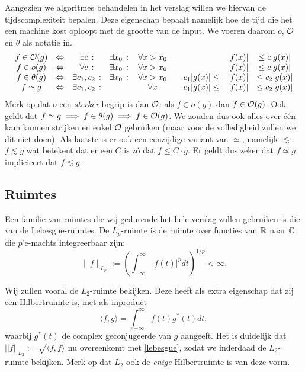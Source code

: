 Aangezien we algoritmes behandelen in het verslag willen we hiervan de tijdscomplexiteit bepalen.
Deze eigenschap bepaalt namelijk hoe de tijd die het een machine kost oploopt met de grootte van de input.
We voeren daarom $o$, $\mathcal{O}$ en $\theta$ als notatie in.
\begin{equation*}
\begin{array}{cccccccc}
  f \in \mathcal{O}(g)     &\Leftrightarrow& \exists c     \,:&\exists x_0  \,:&\, 
  \forall x>x_0 \quad&& |f(x)| &\leq c|g(x)|  \\
  f \in o(g)      &\Leftrightarrow& \forall c     \,:&\exists x_0  \,:&\, 
  \forall x>x_0 \quad&& |f(x)| &\leq c |g(x)| \\ 
  f \in \theta(g) &\Leftrightarrow& \exists c_1,c_2\,:&\exists x_0  \,:&\, 
  \forall x>x_0 \quad& c_1|g(x)| \leq & |f(x)| &\leq c_2|g(x)|  \\
  f \simeq g & \Leftrightarrow& \exists c_1,c_2\,:& \,&\, 
  \forall x \quad& c_1|g(x)| \leq & |f(x)| &\leq c_2|g(x)| 

\end{array}
\end{equation*}
Merk op dat $o$ een \emph{sterker} begrip is dan $\mathcal{O}$: als $f \in o(g)$ dan $f \in \mathcal{O}(g)$. Ook geldt dat $f\simeq g \implies f\in\theta(g) \implies f \in \mathcal{O}(g)$. We zouden dus ook alles over \'e\'en kam kunnen strijken en enkel $\mathcal{O}$ gebruiken (maar voor de volledigheid zullen we dit niet doen). Als laatste is er ook een eenzijdige variant van $\simeq$, namelijk $\lesssim$: $f \lesssim g$ wat betekent dat er een $C$ is z\'o dat $f \leq C \cdot g$. Er geldt dus zeker dat $f\simeq g$ implicieert dat $f\lesssim g$.

\subsection{Ruimtes}
\label{ruimtes}
Een familie van ruimtes die wij gedurende het hele verslag zullen gebruiken is die van de Lebesgue-ruimtes. De $L_p$-ruimte is de ruimte over functies van $\mathbb{R}$ naar $\mathbb{C}$ die $p$'e-machts integreerbaar zijn:
\begin{equation}
	\label{lebesgue}
	\| f \|_{L_p} := \left(\int_{-\infty}^\infty |f(t)|^p dt\right)^{1/p} < \infty.
\end{equation}

Wij zullen vooral de $L_2$-ruimte bekijken. Deze heeft als extra eigenschap dat zij een Hilbertruimte is, 
met als inproduct
\begin{equation}
	\label{l2}
	\langle f, g \rangle = \int_{-\infty}^\infty f(t) g^*(t) dt,
\end{equation}
waarbij $g^*(t)$ de complex geconjugeerde van $g$ aangeeft.
Het is duidelijk dat $ || f ||_{L_2} := \sqrt{\langle f, f \rangle}$ nu overeenkomt met \eqref{lebesgue}, zodat we inderdaad de $L_2$-ruimte bekijken. Merk op dat $L_2$ ook de \emph{enige} Hilbertruimte is van deze vorm.

